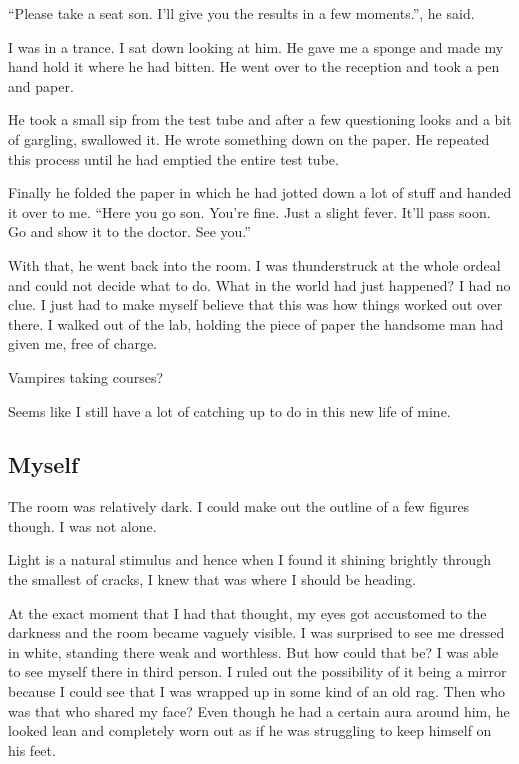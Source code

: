 \documentclass[twoside,11pt]{article}
\begin{document}
``Please take a seat son. I'll give you the results in a few moments.'', he said.

I was in a trance. I sat down looking at him. He gave me a sponge and made my hand hold it where he had bitten. He went over to the reception and took a pen and paper.

He took a small sip from the test tube and after a few questioning looks and a bit of gargling, swallowed it. He wrote something down on the paper. He repeated this process until he had emptied the entire test tube.

Finally he folded the paper in which he had jotted down a lot of stuff and handed it over to me. ``Here you go son. You're fine. Just a slight fever. It'll pass soon. Go and show it to the doctor. See you.''

With that, he went back into the room. I was thunderstruck at the whole ordeal and could not decide what to do. What in the world had just happened? I had no clue. I just had to make myself believe that this was how things worked out over there. I walked out of the lab, holding the piece of paper the handsome man had given me, free of charge.

Vampires taking courses?

Seems like I still have a lot of catching up to do in this new life of mine.

\newpage
\begin{center}
  \section{Myself}
\end{center}
\bigskip
\bigskip
\bigskip

The room was relatively dark. I could make out the outline of a few figures though. I was not alone.

Light is a natural stimulus and hence when I found it shining brightly through the smallest of cracks, I knew that was where I should be heading.

At the exact moment that I had that thought, my eyes got accustomed to the darkness and the room became vaguely visible. I was surprised to see me dressed in white, standing there weak and worthless. But how could that be? I was able to see myself there in third person. I ruled out the possibility of it being a mirror because I could see that I was wrapped up in some kind of an old rag. Then who was that who shared my face? Even though he had a certain aura around him, he looked lean and completely worn out as if he was struggling to keep himself on his feet.
\end{document}
